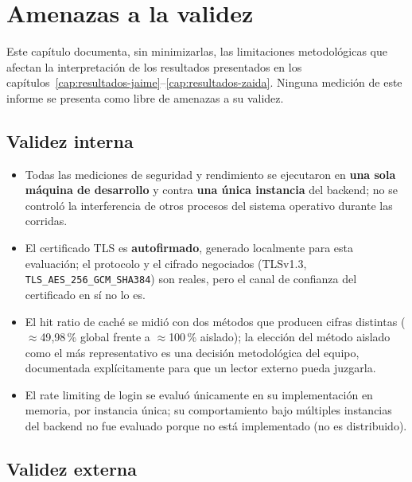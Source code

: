 \chapter{Amenazas a la validez}
\label{cap:amenazas-validez}

Este cap\'itulo documenta, sin minimizarlas, las limitaciones metodol\'ogicas
que afectan la interpretaci\'on de los resultados presentados en los
cap\'itulos~\ref{cap:resultados-jaime}--\ref{cap:resultados-zaida}. Ninguna
medici\'on de este informe se presenta como libre de amenazas a su
validez.

\section{Validez interna}

\begin{itemize}[nosep]
  \item Todas las mediciones de seguridad y rendimiento se ejecutaron en
    \textbf{una sola m\'aquina de desarrollo} y contra \textbf{una \'unica
    instancia} del backend; no se control\'o la interferencia de otros
    procesos del sistema operativo durante las corridas.
  \item El certificado TLS es \textbf{autofirmado}, generado localmente
    para esta evaluaci\'on; el protocolo y el cifrado negociados
    (TLSv1.3, \texttt{TLS\_AES\_256\_GCM\_SHA384}) son reales, pero el
    canal de confianza del certificado en s\'i no lo es.
  \item El hit ratio de cach\'e se midi\'o con dos m\'etodos que producen
    cifras distintas ($\approx$49{,}98\,\% global frente a $\approx$100\,\%
    aislado); la elecci\'on del m\'etodo aislado como el m\'as
    representativo es una decisi\'on metodol\'ogica del equipo, documentada
    expl\'icitamente para que un lector externo pueda juzgarla.
  \item El rate limiting de login se evalu\'o \'unicamente en su
    implementaci\'on en memoria, por instancia \'unica; su comportamiento
    bajo m\'ultiples instancias del backend no fue evaluado porque no est\'a
    implementado (no es distribuido).
\end{itemize}

\section{Validez externa}

